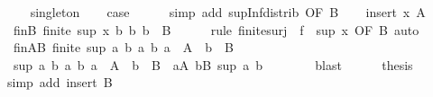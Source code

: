 \begin{isabellebody}
\ \ \isamarkupfalse%
\ singleton\ \isamarkupfalse%
\ \isamarkupfalse%
\ {\isacharquery}{\kern0pt}case\isanewline
\ \ \ \ \isamarkupfalse%
\ {\isacharparenleft}{\kern0pt}simp\ add{\isacharcolon}{\kern0pt}\ sup{\isacharunderscore}{\kern0pt}Inf{}{\isacharunderscore}{\kern0pt}distrib\ {\isacharbrackleft}{\kern0pt}OF\ B{\isacharbrackright}{\kern0pt}{\isacharparenright}{\kern0pt}\isanewline
{}\isamarkupfalse%
\isanewline
\ \ \isamarkupfalse%
\ {\isacharparenleft}{\kern0pt}insert\ x\ A{\isacharparenright}{\kern0pt}\isanewline
\ \ \isamarkupfalse%
\ finB{\isacharcolon}{\kern0pt}\ {\isachardoublequoteopen}finite\ {\isacharbraceleft}{\kern0pt}sup\ x\ b\ {\isacharbar}{\kern0pt}b{\isachardot}{\kern0pt}\ b\ {\isasymin}\ B{\isacharbraceright}{\kern0pt}{\isachardoublequoteclose}\isanewline
\ \ \ \ \isamarkupfalse%
\ {\isacharparenleft}{\kern0pt}rule\ finite{\isacharunderscore}{\kern0pt}surj\ {\isacharbrackleft}{\kern0pt}\ f\ {\isacharequal}{\kern0pt}\ {\isachardoublequoteopen}sup\ x{\isachardoublequoteclose}{\isacharcomma}{\kern0pt}\ OF\ B{\isacharparenleft}{\kern0pt}{}{\isacharparenright}{\kern0pt}{\isacharbrackright}{\kern0pt}{\isacharcomma}{\kern0pt}\ auto{\isacharparenright}{\kern0pt}\isanewline
\ \ \isamarkupfalse%
\ finAB{\isacharcolon}{\kern0pt}\ {\isachardoublequoteopen}finite\ {\isacharbraceleft}{\kern0pt}sup\ a\ b\ {\isacharbar}{\kern0pt}a\ b{\isachardot}{\kern0pt}\ a\ {\isasymin}\ A\ {\isasymand}\ b\ {\isasymin}\ B{\isacharbraceright}{\kern0pt}{\isachardoublequoteclose}\isanewline
\ \ \isamarkupfalse%
\ {\isacharminus}{\kern0pt}\isanewline
\ \ \ \ \isamarkupfalse%
\ {\isachardoublequoteopen}{\isacharbraceleft}{\kern0pt}sup\ a\ b\ {\isacharbar}{\kern0pt}a\ b{\isachardot}{\kern0pt}\ a\ {\isasymin}\ A\ {\isasymand}\ b\ {\isasymin}\ B{\isacharbraceright}{\kern0pt}\ {\isacharequal}{\kern0pt}\ {\isacharparenleft}{\kern0pt}{\isasymUnion}a{\isasymin}A{\isachardot}{\kern0pt}\ {\isasymUnion}b{\isasymin}B{\isachardot}{\kern0pt}\ {\isacharbraceleft}{\kern0pt}sup\ a\ b{\isacharbraceright}{\kern0pt}{\isacharparenright}{\kern0pt}{\isachardoublequoteclose}\isanewline
\ \ \ \ \ \ \isamarkupfalse%
\ blast\isanewline
\ \ \ \ \isamarkupfalse%
\ {\isacharquery}{\kern0pt}thesis\ \isamarkupfalse%
{\isacharparenleft}{\kern0pt}simp\ add{\isacharcolon}{\kern0pt}\ insert{\isacharparenleft}{\kern0pt}{}{\isacharparenright}{\kern0pt}\ B{\isacharparenleft}{\kern0pt}{}{\isacharparenright}{\kern0pt}{\isacharparenright}{\kern0pt}\isanewline

\end{isabellebody}
